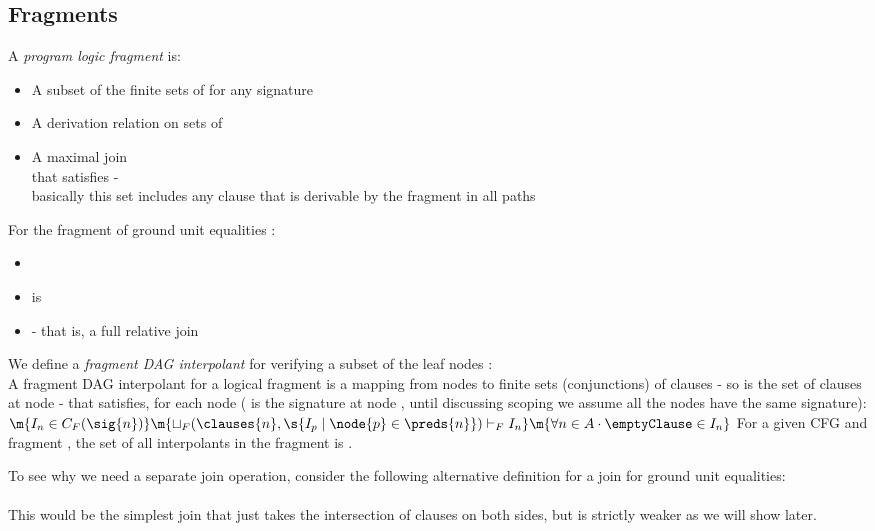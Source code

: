 \subsection{Fragments}
A \emph{program logic fragment}  is:
\begin{itemize}
	\item A subset  of the finite sets of \Cs{\sig} for any signature \sig{}
	\item A derivation relation  on sets of 
	\item A maximal join  \\
	that satisfies  - \\
	basically this set includes any clause that is derivable by the fragment in all paths
\end{itemize}

\noindent
For the fragment of ground unit equalities \m{=}:
\begin{itemize}
	\item {}
	\item \m{\vdash_{=}} is 
	\item {} - 
	that is, a full relative join
\end{itemize}

\noindent
We define a \emph{fragment DAG interpolant} for verifying a subset of the leaf nodes :\\
A fragment DAG interpolant  for a logical fragment  is a mapping from nodes to finite sets (conjunctions) of clauses - so  is the set of clauses at node  - that satisfies, for each node  ( is the signature at node , 
until discussing scoping we assume all the nodes have the same signature):\\
$
\m{I_n \in C_F(\sig{n})}\\
\m{\sqcup_F(\clauses{n},\s{I_p \mid \node{p} \in \preds{n}}) \vdash_F I_n}\\
\m{\forall n \in A \cdot \emptyClause \in I_n}\\
$
For a given CFG and fragment , the set of all interpolants in the fragment  is .

\noindent
To see why we need a separate join operation, consider the following alternative definition for a join for ground unit equalities:\\
\\
This would be the simplest join that just takes the intersection of clauses on both sides, but is strictly weaker as we will show later.

